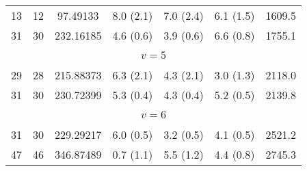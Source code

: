 \begin{table*}[htp]
\begin{tabular}{ccccccc}
 13 & 12 & 97.49133 & 8.0 (2.1) & 7.0 (2.4) & 6.1 (1.5) & 1609.5 \\
 31 & 30 & 232.16185 & 4.6 (0.6) & 3.9 (0.6) & 6.6 (0.8) & 1755.1 \\
&\vspace{-0.75em}\\
\multicolumn{7}{c}{$v = 5$} \\
\vspace{-0.75em}\\
 29 & 28 & 215.88373 & 6.3 (2.1) & 4.3 (2.1) & 3.0 (1.3) & 2118.0 \\
 31 & 30 & 230.72399 & 5.3 (0.4) & 4.3 (0.4) & 5.2 (0.5) & 2139.8 \\
&\vspace{-0.75em}\\
\multicolumn{7}{c}{$v = 6$} \\
\vspace{-0.75em}\\
 31 & 30 & 229.29217 & 6.0 (0.5) & 3.2 (0.5) & 4.1 (0.5) & 2521.2 \\
 47 & 46 & 346.87489 & 0.7 (1.1) & 5.5 (1.2) & 4.4 (0.8) & 2745.3 \\
\hline
\end{tabular}

\par 
\end{table*}
